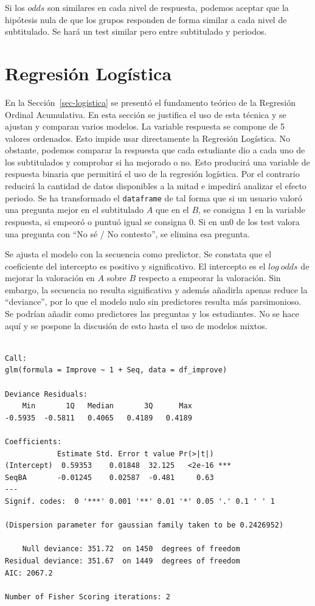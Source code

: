 \documentclass[
  12pt,
  a4paper,
  extrafontsizes,
  onecolumn,
  openright]{memoir}
\begin{document}
Si los \(odds\) son similares en cada nivel de respuesta, podemos
aceptar que la hipótesis nula de que los grupos responden de forma
similar a cada nivel de subtitulado. Se hará un test similar pero entre
subtitulado y periodos.

\hypertarget{sec-logistica-2}{%
\section{Regresión Logística}\label{sec-logistica-2}}

En la Sección~\ref{sec-logistica} se presentó el fundamento teórico de
la Regresión Ordinal Acumulativa. En esta sección se justifica el uso de
esta técnica y se ajustan y comparan varios modelos. La variable
respuesta se compone de 5 valores ordenados. Esto impide usar
directamente la Regresión Logística. No obstante, podemos comparar la
respuesta que cada estudiante dio a cada uno de los subtitulados y
comprobar si ha mejorado o no. Esto producirá una variable de respuesta
binaria que permitirá el uso de la regresión logística. Por el contrario
reducirá la cantidad de datos disponibles a la mitad e impedirá analizar
el efecto periodo. Se ha transformado el \texttt{dataframe} de tal forma
que si un usuario valoró una pregunta mejor en el subtitulado \(A\) que
en el \(B\), se consigna 1 en la variable respuesta, si empeoró o puntuó
igual se consigna 0. Si en un0 de los test valora una pregunta con
\enquote{No sé / No contesto}, se elimina esa pregunta.

Se ajusta el modelo con la secuencia como predictor. Se constata que el
coeficiente del intercepto es positivo y significativo. El intercepto es
el \(log\ odds\) de mejorar la valoración en \(A\) sobre \(B\) respecto
a empeorar la valoración. Sin embargo, la secuencia no resulta
significativa y además añadirla apenas reduce la \enquote{deviance}, por
lo que el modelo nulo sin predictores resulta más parsimonioso. Se
podrían añadir como predictores las preguntas y los estudiantes. No se
hace aquí y se pospone la discusión de esto hasta el uso de modelos
mixtos.

\begin{verbatim}

Call:
glm(formula = Improve ~ 1 + Seq, data = df_improve)

Deviance Residuals: 
    Min       1Q   Median       3Q      Max  
-0.5935  -0.5811   0.4065   0.4189   0.4189  

Coefficients:
            Estimate Std. Error t value Pr(>|t|)    
(Intercept)  0.59353    0.01848  32.125   <2e-16 ***
SeqBA       -0.01245    0.02587  -0.481     0.63    
---
Signif. codes:  0 '***' 0.001 '**' 0.01 '*' 0.05 '.' 0.1 ' ' 1

(Dispersion parameter for gaussian family taken to be 0.2426952)

    Null deviance: 351.72  on 1450  degrees of freedom
Residual deviance: 351.67  on 1449  degrees of freedom
AIC: 2067.2

Number of Fisher Scoring iterations: 2
\end{verbatim}
\end{document}
